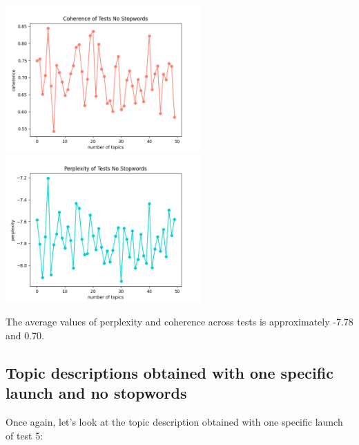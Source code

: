 \documentclass[10pt]{article} %
\begin{document}
	\begin{center}
		\includegraphics[width=7.5cm]{images/coherence_no_stopwords}
		\includegraphics[width=7.5cm]{images/perplexity_no_stopwords}
	\end{center}
	
	The average values of perplexity and coherence across tests is approximately -7.78 and 0.70. 
	
	\subsection{Topic descriptions obtained with one specific launch and no stopwords}\label{test_8_ns_1}
	
	Once again, let's look at the topic description obtained with one specific launch of test 5:
	
\end{document}
